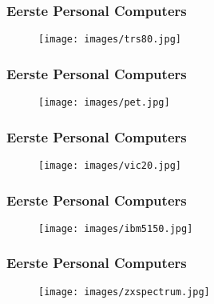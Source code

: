\documentclass[aspectratio=43]{uva-inf-presentation}
\begin{document}

\begin{frame}
\frametitle{Eerste Personal Computers}

\begin{figure}
\texttt{[image: images/trs80.jpg]}
\end{figure}

\end{frame}


\begin{frame}
\frametitle{Eerste Personal Computers}

\begin{figure}
\texttt{[image: images/pet.jpg]}
\end{figure}

\end{frame}


\begin{frame}
\frametitle{Eerste Personal Computers}

\begin{figure}
\texttt{[image: images/vic20.jpg]}
\end{figure}

\end{frame}


\begin{frame}
\frametitle{Eerste Personal Computers}

\begin{figure}
\texttt{[image: images/ibm5150.jpg]}
\end{figure}

\end{frame}


\begin{frame}
\frametitle{Eerste Personal Computers}

\begin{figure}
\texttt{[image: images/zxspectrum.jpg]}
\end{figure}

\end{frame}
\end{document}
